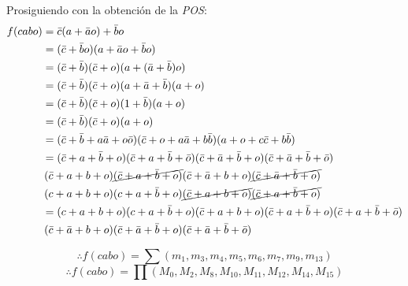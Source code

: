 \documentclass[../procedimientos.tex]{subfiles}
\begin{document}
Prosiguiendo con la obtención de la \textit{POS}:
\begin{align*}
  f(cabo) &= \bar{c} (a + \bar{a}o) + \bar{b} o\\
  &= (\bar{c} + \bar{b}o)(a + \bar{a}o + \bar{b}o)\\
  &= (\bar{c} + \bar{b})(\bar{c} + o)(a + (\bar{a} + \bar{b}) o)\\
  &= (\bar{c} + \bar{b})(\bar{c} + o)(a + \bar{a} + \bar{b}) (a + o)\\
  &= (\bar{c} + \bar{b})(\bar{c} + o)(1 + \bar{b})(a + o)\\
  &= (\bar{c} + \bar{b})(\bar{c} + o)(a + o)\\
  &= (\bar{c} + \bar{b} + a\bar{a} + o\bar{o})(\bar{c} + o + a\bar{a} + b\bar{b})(a + 
  o + c\bar{c} + b\bar{b})\\
  &= (\bar{c}+a+\bar{b}+o) (\bar{c}+a+\bar{b}+\bar{o}) (\bar{c}+\bar{a}+\bar{b}+o) 
  (\bar{c}+\bar{a}+\bar{b}+\bar{o})\\
  &\, (\bar{c}+a+b+o) \cancel{(\bar{c}+a+\bar{b}+o)} (\bar{c}+\bar{a}+b+o) 
  \cancel{(\bar{c}+\bar{a}+\bar{b}+o)}\\
  &\,(c+a+b+o) (c+a+\bar{b}+o) \cancel{(\bar{c}+a+b+o)} 
  \cancel{(\bar{c}+a+\bar{b}+o)}\\
  &= (c+a+b+o) (c+a+\bar{b}+o) (\bar{c}+a+b+o) (\bar{c}+a+\bar{b}+o) 
  (\bar{c}+a+\bar{b}+\bar{o})\\
  &\, (\bar{c}+\bar{a}+b+o) (\bar{c}+\bar{a}+\bar{b}+o) 
(\bar{c}+\bar{a}+\bar{b}+\bar{o})\\
\end{align*}

\begin{equation*}
  \boxed{
    \therefore f(cabo) = \sum (m_1, m_3, m_4, m_5, m_6, m_7, m_9, m_{13})
  }
\end{equation*}
\begin{equation*}
  \boxed{
    \therefore f(cabo) = \prod (M_0, M_2, M_8, M_{10}, M_{11}, M_{12}, M_{14}, 
  M_{15})
  }
\end{equation*}
\end{document}

